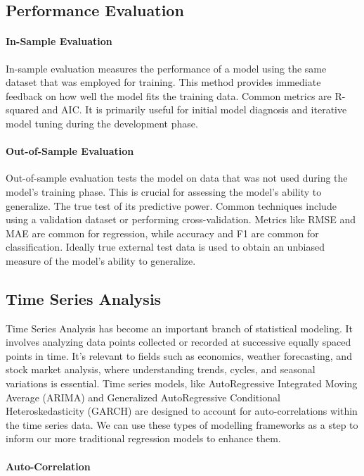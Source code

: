 \documentclass[12pt, twoside,hidelinks]{article}
\theoremstyle{definition}
\numberwithin{equation}{section}
\begin{document}
\subsection{Performance Evaluation}

\paragraph{In-Sample Evaluation}
In-sample evaluation measures the performance of a model using the same dataset that was employed for training. This method provides immediate feedback on how well the model fits the training data. Common metrics are R-squared and AIC. It is primarily useful for initial model diagnosis and iterative model tuning during the development phase.

\paragraph{Out-of-Sample Evaluation}
Out-of-sample evaluation tests the model on data that was not used during the model's training phase. This is crucial for assessing the model's ability to generalize. The true test of its predictive power. Common techniques include using a validation dataset or performing cross-validation. Metrics like RMSE and MAE are common for regression, while accuracy and F1 are common for classification. Ideally true external test data is used to obtain an unbiased measure of the model's ability to generalize.


\subsection{Time Series Analysis}\label{sec:app:time_series}

Time Series Analysis has become an important branch of statistical modeling. It involves analyzing data points collected or recorded at successive equally spaced points in time. It's relevant to fields such as economics, weather forecasting, and stock market analysis, where understanding trends, cycles, and seasonal variations is essential. Time series models, like AutoRegressive Integrated Moving Average (ARIMA) and  Generalized AutoRegressive Conditional Heteroskedasticity (GARCH) are designed to account for auto-correlations within the time series data. We can use these types of modelling frameworks as a step to inform our more traditional regression models to enhance them. 

\paragraph{Auto-Correlation}
\end{document}
